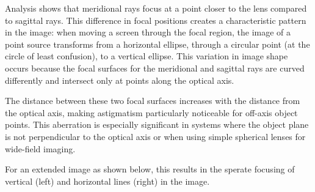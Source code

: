 \documentclass[
  a4paper,
]{book}
\begin{document}
Analysis shows that meridional rays focus at a point closer to the lens
compared to sagittal rays. This difference in focal positions creates a
characteristic pattern in the image: when moving a screen through the
focal region, the image of a point source transforms from a horizontal
ellipse, through a circular point (at the circle of least confusion), to
a vertical ellipse. This variation in image shape occurs because the
focal surfaces for the meridional and sagittal rays are curved
differently and intersect only at points along the optical axis.

The distance between these two focal surfaces increases with the
distance from the optical axis, making astigmatism particularly
noticeable for off-axis object points. This aberration is especially
significant in systems where the object plane is not perpendicular to
the optical axis or when using simple spherical lenses for wide-field
imaging.

For an extended image as shown below, this results in the sperate
focusing of vertical (left) and horizontal lines (right) in the image.
\end{document}
